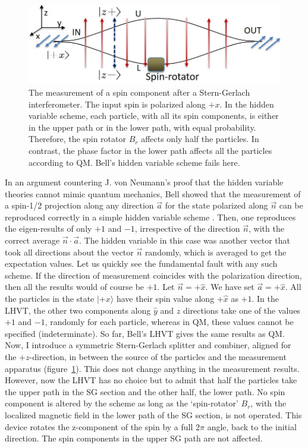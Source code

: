 \begin{figure}[H]
\centering
\includegraphics[scale=0.65]{src/images/chap27/4.jpg}
\caption{The measurement of a spin component after a Stern-Gerlach interferometer. The input spin
is polarized along $+x$. In the hidden variable scheme, each particle, with all its spin components,
is either in the upper path or in the lower path, with equal probability. Therefore, the spin rotator
$B_r$ affects only half the particles. In contrast, the phase factor in the lower path affects all the
particles according to QM. Bell's hidden variable scheme fails here.}\label{ch14-fig4}
\end{figure}
\bigskip


In an argument countering J. von Neumann's proof that the hidden variable theories 
cannot mimic quantum mechanics, Bell showed that the measurement of a spin-1/2 projection
along any direction $\vec{a}$ for the state polarized along $\vec{n}$ can be reproduced correctly in a simple
hidden variable scheme \cite{chap14-key13}. Then, one reproduces the eigen-results of only $+1$ and $-1$, 
irrespective of the direction $\vec{n}$, with the correct average $\vec{n} \cdot \vec{a}$.
 The hidden variable in this case was another vector that took all directions about the vector $\vec{n}$ randomly, which is averaged to
get the expectation values. Let us quickly see the fundamental fault with any such scheme.
If the direction of measurement coincides with the polarization direction, then all the results
would of course be $+1$. Let $\vec{n} = + \hat{x}$. We have set $\vec{a} = + \hat{x}$. All the particles in the state
$|+x \rangle $ have their spin value along $+ \hat{x}$ as $+1$. In the LHVT, the other two components along
$\hat{y}$ and $\hat{z}$ directions take one of the values $+1$ and $-1$, randomly for each particle, whereas in
QM, these values cannot be specified (indeterminate). So far, Bell's LHVT gives the same
results as QM. Now, I introduce a symmetric Stern-Gerlach splitter and combiner, aligned
for the $+z$-direction, in between the source of the particles and the measurement apparatus
(figure~\ref{ch14-fig4}). This does not change anything in the measurement results. However, now the
LHVT has no choice but to admit that half the particles take the upper path in the SG
section and the other half, the lower path. No spin component is altered by the scheme as
long as the `spin-rotator' $B_r$, with the localized magnetic field in the lower path of the SG
section, is not operated. This device rotates the z-component of the spin by a full $2\pi$ angle, back to the initial
direction. The spin components in the upper SG path are not affected.

